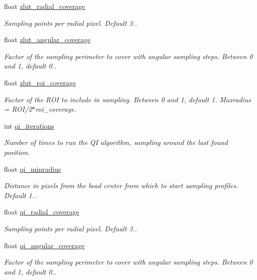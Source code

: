 \begin{DoxyCompactItemize}
float \hyperlink{struct_q_trk_settings_ae57544152a8a129bae6cb934feead1c7}{zlut\+\_\+radial\+\_\+coverage}
\begin{DoxyCompactList}\small\item\em Sampling points per radial pixel. Default 3.. \end{DoxyCompactList}\item 
float \hyperlink{struct_q_trk_settings_a8892aa193827371fc06ee94254e68b09}{zlut\+\_\+angular\+\_\+coverage}
\begin{DoxyCompactList}\small\item\em Factor of the sampling perimeter to cover with angular sampling steps. Between 0 and 1, default 0.. \end{DoxyCompactList}\item 
float \hyperlink{struct_q_trk_settings_a33db8dee144b4a042f5440fa1f210e6a}{zlut\+\_\+roi\+\_\+coverage}
\begin{DoxyCompactList}\small\item\em Factor of the R\+OI to include in sampling. Between 0 and 1, default 1. Maxradius = R\+O\+I/2$\ast$roi\+\_\+coverage. \end{DoxyCompactList}\item 
int \hyperlink{struct_q_trk_settings_a12105babb328a9a7ec90f0eab074fabb}{qi\+\_\+iterations}
\begin{DoxyCompactList}\small\item\em Number of times to run the QI algorithm, sampling around the last found position. \end{DoxyCompactList}\item 
float \hyperlink{struct_q_trk_settings_a7b5f3e61b4dcab6330c56e7bcd96e82d}{qi\+\_\+minradius}
\begin{DoxyCompactList}\small\item\em Distance in pixels from the bead center from which to start sampling profiles. Default 1.. \end{DoxyCompactList}\item 
float \hyperlink{struct_q_trk_settings_abee59fa2f68d9e514500062f73b1d512}{qi\+\_\+radial\+\_\+coverage}
\begin{DoxyCompactList}\small\item\em Sampling points per radial pixel. Default 3.. \end{DoxyCompactList}\item 
float \hyperlink{struct_q_trk_settings_a08800ed7809dc4bde16d0a6fee08ecdd}{qi\+\_\+angular\+\_\+coverage}
\begin{DoxyCompactList}\small\item\em Factor of the sampling perimeter to cover with angular sampling steps. Between 0 and 1, default 0.. \end{DoxyCompactList}\item 

\end{DoxyCompactItemize}
